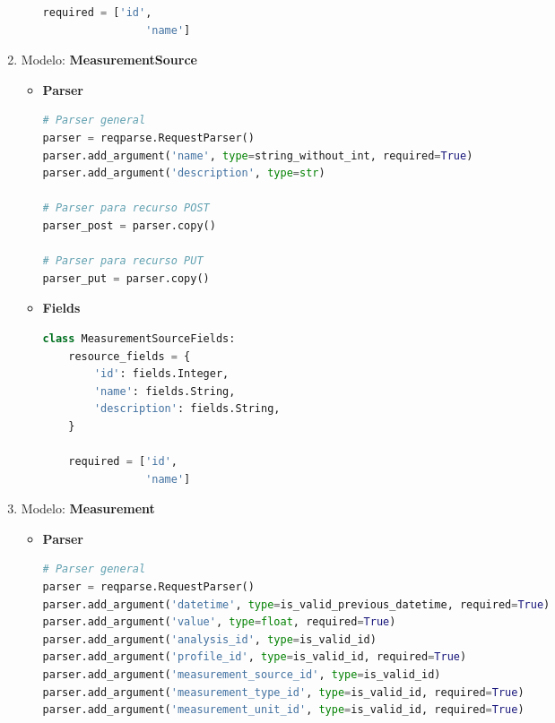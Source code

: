 \documentclass[a4paper,12pt]{article}
\begin{document}
\begin{enumerate}
\begin{itemize}
\begin{lstlisting}[language=Python]
    required = ['id',
                'name']
\end{lstlisting}

\end{itemize}

\item Modelo: \textbf{MeasurementSource}

\begin{itemize}
	\item \textbf{Parser}
	
\begin{lstlisting}[language=Python]
# Parser general
parser = reqparse.RequestParser()
parser.add_argument('name', type=string_without_int, required=True)
parser.add_argument('description', type=str)

# Parser para recurso POST
parser_post = parser.copy()

# Parser para recurso PUT
parser_put = parser.copy()
\end{lstlisting}

	\item \textbf{Fields}
	
\begin{lstlisting}[language=Python]
class MeasurementSourceFields:
    resource_fields = {
        'id': fields.Integer,
        'name': fields.String,
        'description': fields.String,
    }

    required = ['id',
                'name']

\end{lstlisting}

\end{itemize}

\item Modelo: \textbf{Measurement}

\begin{itemize}
	\item \textbf{Parser}

\begin{lstlisting}[language=Python]
# Parser general
parser = reqparse.RequestParser()
parser.add_argument('datetime', type=is_valid_previous_datetime, required=True)
parser.add_argument('value', type=float, required=True)
parser.add_argument('analysis_id', type=is_valid_id)
parser.add_argument('profile_id', type=is_valid_id, required=True)
parser.add_argument('measurement_source_id', type=is_valid_id)
parser.add_argument('measurement_type_id', type=is_valid_id, required=True)
parser.add_argument('measurement_unit_id', type=is_valid_id, required=True)


\end{lstlisting}
\end{itemize}
\end{enumerate}
\end{document}
